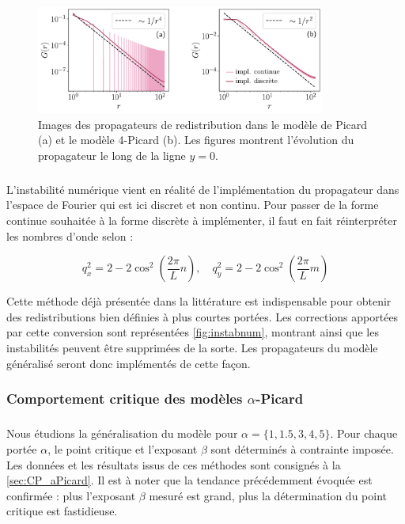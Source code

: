 \begin{figure}[h]
	\centering
	\includegraphics[width=0.85\textwidth]{Chapitre4/Figures/LonguePortee/ResolutionOscillationsPropagateur.pdf}
	\caption{Images des propagateurs de redistribution dans le modèle de Picard (a) et le modèle 4-Picard (b). Les figures montrent l'évolution du propagateur le long de la ligne $y=0$.}
	\label{fig:instabnum}
\end{figure}

\subparagraph{}L'instabilité numérique vient en réalité de l'implémentation du propagateur dans l'espace de Fourier qui est ici discret et non continu. Pour passer de la forme continue souhaitée à la forme discrète à implémenter, il faut en fait réinterpréter les nombres d'onde selon :

\begin{equation}
	q_x^2 = 2-2\cos^2\left( \frac{2\pi}{L}n \right),\quad q_y^2 = 2-2\cos^2\left( \frac{2\pi}{L}m \right)
\end{equation}

\noindent Cette méthode déjà présentée dans la littérature \cite{ferrero_criticality_2019, rossi_finite-disorder_2022} est indispensable pour obtenir des redistributions bien définies à plus courtes portées. Les corrections apportées par cette conversion sont représentées \autoref{fig:instabnum}, montrant ainsi que les instabilités peuvent être supprimées de la sorte. Les propagateurs du modèle généralisé seront donc implémentés de cette façon.

\subsubsection{Comportement critique des modèles $\alpha$-Picard}

\label{sec:criticalitealphapicard}

\subparagraph{}Nous étudions la généralisation du modèle pour $\alpha = \{1, 1.5, 3, 4, 5\}$. Pour chaque portée $\alpha$, le point critique et l'exposant $\beta$ sont déterminés à contrainte imposée. Les données et les résultats issus de ces méthodes sont consignés à la \autoref{sec:CP_aPicard}. Il est à noter que la tendance précédemment évoquée est confirmée : plus l'exposant $\beta$ mesuré est grand, plus la détermination du point critique est fastidieuse.

